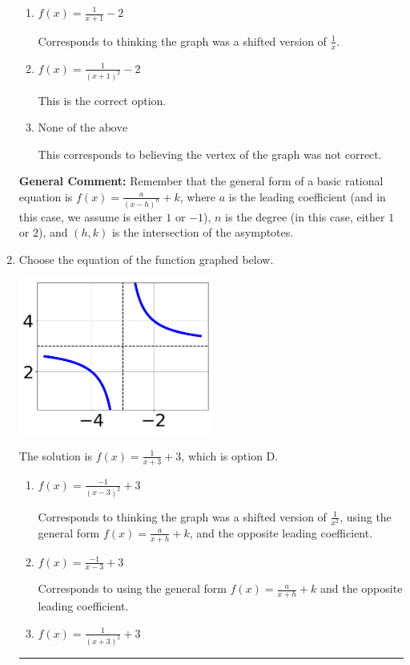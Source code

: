 \documentclass{extbook}[14pt]
\newcommand{\litem}[1]{\item #1

\rule{\textwidth}{0.4pt}}
\begin{document}
\begin{enumerate}
{\begin{enumerate}[label=\Alph*.]
Corresponds to thinking the graph was a shifted version of $\frac{1}{x}$, using the general form $f(x) = \frac{a}{(x+h)^2}+k$, and the opposite leading coefficient.
\item \( f(x) = \frac{1}{x + 1} - 2 \)

Corresponds to thinking the graph was a shifted version of $\frac{1}{x}$.
\item \( f(x) = \frac{1}{(x + 1)^2} - 2 \)

This is the correct option.
\item \( \text{None of the above} \)

This corresponds to believing the vertex of the graph was not correct.
\end{enumerate}

\textbf{General Comment:} Remember that the general form of a basic rational equation is $ f(x) = \frac{a}{(x-h)^n} + k$, where $a$ is the leading coefficient (and in this case, we assume is either $1$ or $-1$), $n$ is the degree (in this case, either $1$ or $2$), and $(h, k)$ is the intersection of the asymptotes.
}
\litem{
Choose the equation of the function graphed below.

\begin{center}
    \includegraphics[width=0.5\textwidth]{../Figures/rationalGraphToEquationCopyC.png}
\end{center}


The solution is \( f(x) = \frac{1}{x + 3} + 3 \), which is option D.\begin{enumerate}[label=\Alph*.]
\item \( f(x) = \frac{-1}{(x - 3)^2} + 3 \)

Corresponds to thinking the graph was a shifted version of $\frac{1}{x^2}$, using the general form $f(x) = \frac{a}{x+h}+k$, and the opposite leading coefficient.
\item \( f(x) = \frac{-1}{x - 3} + 3 \)

Corresponds to using the general form $f(x) = \frac{a}{x+h}+k$ and the opposite leading coefficient.
\item \( f(x) = \frac{1}{(x + 3)^2} + 3 \)


\end{enumerate}}
\end{enumerate}
\end{document}
